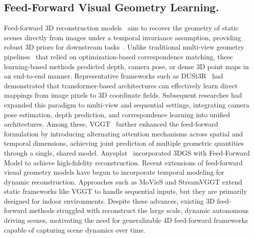 \subsection{Feed-Forward Visual Geometry Learning.}
Feed-forward 3D reconstruction models~\cite{wang2024dust3r, wang2025vggt, jiang2025anysplat} aim to recover the geometry of static scenes directly from images under a temporal invariance assumption, providing robust 3D priors for downstream tasks~\citep{chen2024vpl, li2025papl, li2025constrained, liartdeco, li2026ec, gaodeep, gaogood}.
Unlike traditional multi-view geometry pipelines~\cite{mur2015orb, mur2017orb} that relied on optimization-based correspondence matching, these learning-based methods predicted depth, camera pose, or dense 3D point maps in an end-to-end manner. 
Representative frameworks such as DUSt3R~\cite{wang2024dust3r} had demonstrated that transformer-based architectures can effectively learn direct mappings from image pixels to 3D coordinate fields. Subsequent researches had expanded this paradigm to multi-view and sequential settings, integrating camera pose estimation, depth prediction, and correspondence learning into unified architectures. 
Among these, VGGT~\cite{wang2025vggt} further enhanced the feed-forward formulation by introducing alternating attention mechanisms across spatial and temporal dimensions, achieving joint prediction of multiple geometric quantities through a single, shared model. 
Anysplat~\cite{jiang2025anysplat} incorporated 3DGS with Feed-Forward Model to achieve high-fidelity reconstruction. Recent extensions of feed-forward visual geometry models have begun to incorporate temporal modeling for dynamic reconstruction. Approaches such as MoVieS\cite{lin2025movies} and StreamVGGT\cite{zhuo2025streaming} extend static frameworks like VGGT to handle sequential inputs, but they are primarily designed for indoor environments.
Despite these advances, existing 3D feed-forward methods struggled with reconstruct the large scale, dynamic autonomous driving scenes, motivating the need for generalizable 4D feed-forward frameworks capable of capturing scene dynamics over time.


